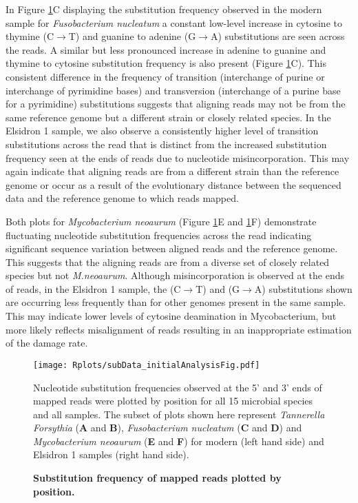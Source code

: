 \documentclass[12pt, a4paper]{article}
\begin{document}
In Figure \ref{fig:subDataInitialFig}C displaying the substitution frequency observed in the modern sample for \textit{Fusobacterium nucleatum} a constant low-level increase in cytosine to thymine (C$\to$T) and guanine to adenine (G$\to$A) substitutions are seen across the reads.  
A similar but less pronounced increase in adenine to guanine and thymine to cytosine substitution frequency is also present (Figure \ref{fig:subDataInitialFig}C). 
This consistent difference in the frequency of transition (interchange of purine or interchange of pyrimidine bases) and transversion (interchange of a purine base for a pyrimidine) substitutions suggests that aligning reads may not be from the same reference genome but a different strain or closely related species.
In the Elsidron 1 sample, we also observe a consistently higher level of transition substitutions across the read that is distinct from the increased substitution frequency seen at the ends of reads due to nucleotide misincorporation.
This may again indicate that aligning reads are from a different strain than the reference genome or occur as a result of the evolutionary distance between the sequenced data and the reference genome to which reads mapped. 

Both plots for \textit{Mycobacterium neoaurum} (Figure \ref{fig:subDataInitialFig}E and \ref{fig:subDataInitialFig}F) demonstrate fluctuating  nucleotide substitution frequencies across the read indicating significant sequence variation between aligned reads and the reference genome. 
This suggests that the aligning reads are from a diverse set of closely related species but not \textit{M.neoaurum}. 
Although misincorporation is observed at the ends of reads, in the Elsidron 1 sample, the (C$\to$T) and (G$\to$A) substitutions shown are occurring less frequently than for other genomes present in the same sample.
This may indicate lower levels of cytosine deamination in Mycobacterium, but more likely reflects misalignment of reads resulting in an inappropriate estimation of the damage rate.
\clearpage

\begin{figure}[!ht]
	\setlength{\abovecaptionskip}{10pt}
	\begin{center}
	\texttt{[image: Rplots/subData\_initialAnalysisFig.pdf]}
	\end{center}
	\caption[Substitution frequency of mapped reads plotted by position]{\textbf{Substitution frequency of mapped reads plotted by position.}}\small{Nucleotide substitution frequencies observed at the 5' and 3' ends of mapped reads were plotted by position for all 15 microbial species and all samples. The subset of plots shown here represent \textit{Tannerella Forsythia} (\textbf{A} and \textbf{B}), \textit{Fusobacterium nucleatum} (\textbf{C} and \textbf{D}) and \textit{Mycobacterium neoaurum} (\textbf{E} and \textbf{F}) for modern (left hand side) and Elsidron 1 samples (right hand side). }\label{fig:subDataInitialFig}
\end{figure}
\clearpage
\end{document}
